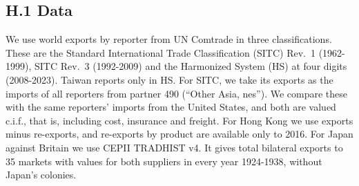 \hypertarget{h.1-data}{%
\subsection*{H.1 Data}\label{h.1-data}}

We use world exports by reporter from UN Comtrade in three
classifications. These are the Standard International Trade
Classification (SITC) Rev.~1 (1962-1999), SITC Rev.~3 (1992-2009) and
the Harmonized System (HS) at four digits (2008-2023). Taiwan reports
only in HS. For SITC, we take its exports as the imports of all
reporters from partner 490 (``Other Asia, nes''). We compare these with
the same reporters' imports from the United States, and both are valued
c.i.f., that is, including cost, insurance and freight. For Hong Kong we
use exports minus re-exports, and re-exports by product are available
only to 2016. For Japan against Britain we use CEPII TRADHIST v4. It
gives total bilateral exports to 35 markets with values for both
suppliers in every year 1924-1938, without Japan's colonies.

